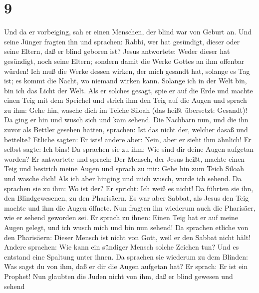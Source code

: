 \hypertarget{section-8}{%
\section{9}\label{section-8}}

 Und da er vorbeiging, sah er einen Menschen, der blind
war von Geburt an.  Und seine Jünger fragten ihn und
sprachen: Rabbi, wer hat gesündigt, dieser oder seine Eltern, daß er
blind geboren ist?  Jesus antwortete: Weder dieser hat
gesündigt, noch seine Eltern; sondern damit die Werke Gottes an ihm
offenbar würden!  Ich muß die Werke dessen wirken, der
mich gesandt hat, solange es Tag ist; es kommt die Nacht, wo niemand
wirken kann.  Solange ich in der Welt bin, bin ich das
Licht der Welt.  Als er solches gesagt, spie er auf die
Erde und machte einen Teig mit dem Speichel und strich ihm den Teig auf
die Augen  und sprach zu ihm: Gehe hin, wasche dich im
Teiche Siloah (das heißt übersetzt: Gesandt)! Da ging er hin und wusch
sich und kam sehend.  Die Nachbarn nun, und die ihn zuvor
als Bettler gesehen hatten, sprachen: Ist das nicht der, welcher dasaß
und bettelte?  Etliche sagten: Er ist\textquotesingle s!
andere aber: Nein, aber er sieht ihm ähnlich! Er selbst sagte: Ich
bin\textquotesingle s!  Da sprachen sie zu ihm: Wie sind
dir deine Augen aufgetan worden?  Er antwortete und
sprach: Der Mensch, der Jesus heißt, machte einen Teig und bestrich
meine Augen und sprach zu mir: Gehe hin zum Teich Siloah und wasche
dich! Als ich aber hinging und mich wusch, wurde ich sehend.
 Da sprachen sie zu ihm: Wo ist der? Er spricht: Ich weiß
es nicht!  Da führten sie ihn, den Blindgewesenen, zu den
Pharisäern.  Es war aber Sabbat, als Jesus den Teig
machte und ihm die Augen öffnete.  Nun fragten ihn
wiederum auch die Pharisäer, wie er sehend geworden sei. Er sprach zu
ihnen: Einen Teig hat er auf meine Augen gelegt, und ich wusch mich und
bin nun sehend!  Da sprachen etliche von den Pharisäern:
Dieser Mensch ist nicht von Gott, weil er den Sabbat nicht hält! Andere
sprachen: Wie kann ein sündiger Mensch solche Zeichen tun? Und es
entstand eine Spaltung unter ihnen.  Da sprachen sie
wiederum zu dem Blinden: Was sagst du von ihm, daß er dir die Augen
aufgetan hat? Er sprach: Er ist ein Prophet!  Nun
glaubten die Juden nicht von ihm, daß er blind gewesen und sehend
